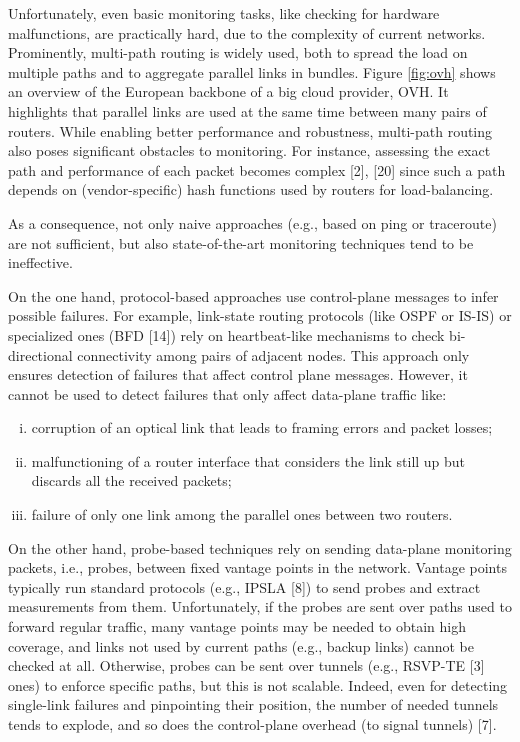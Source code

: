 Unfortunately, even basic monitoring tasks, like checking for hardware malfunctions, are practically hard, due to the
complexity of current networks. Prominently, multi-path routing is widely used, both to spread the load on multiple paths
and to aggregate parallel links in bundles.
Figure \ref{fig:ovh} shows an overview of the European backbone of a big cloud provider,
\textsf{OVH}. It highlights that parallel links are used at the same time between many pairs of routers. While enabling better
performance and robustness, multi-path routing also poses significant obstacles to monitoring. For instance, assessing
the exact path and performance of each packet becomes complex [2], [20] since such a path depends on (vendor-specific) hash functions used by routers for load-balancing.

As a consequence, not only naive approaches (e.g., based on ping or traceroute) are not sufficient, but also 
state-of-the-art monitoring techniques tend to be ineffective.


On the one hand, protocol-based approaches use control-plane messages to infer possible failures. 
For example, link-state routing protocols (like OSPF or IS-IS) or specialized
ones (BFD [14]) rely on heartbeat-like mechanisms to check
bi-directional connectivity among pairs of adjacent nodes. This
approach only ensures detection of failures that affect control plane messages. 
However, it cannot be used to detect failures that only affect data-plane traffic like: 

\begin{enumerate}[i)]
\item corruption of an
optical link that leads to framing errors and packet losses;
\item malfunctioning of a router interface that considers the link still up but discards all the received packets;
\item failure of only one link among the parallel ones between two routers.
\end{enumerate}

On the other hand, probe-based techniques rely on sending
data-plane monitoring packets, i.e., probes, between fixed
vantage points in the network. Vantage points typically run
standard protocols (e.g., IPSLA [8]) to send probes and extract
measurements from them. Unfortunately, if the probes are sent
over paths used to forward regular traffic, many vantage points
may be needed to obtain high coverage, and links not used
by current paths (e.g., backup links) cannot be checked at
all. Otherwise, probes can be sent over tunnels (e.g., RSVP-TE [3] ones) to enforce specific paths, but this is not scalable.
Indeed, even for detecting single-link failures and pinpointing
their position, the number of needed tunnels tends to explode,
and so does the control-plane overhead (to signal tunnels) [7].

